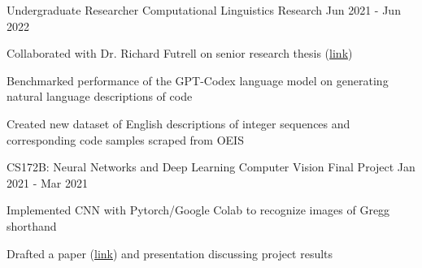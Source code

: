 
\begin{cventries}
    \cventry
	{Undergraduate Researcher}
	{Computational Linguistics Research}
	{}
	{Jun 2021 - Jun 2022}
	{\begin{cvitems}
		\item{Collaborated with Dr. Richard Futrell on senior research thesis (\href{https://www.overleaf.com/read/vchswvmtvtnt}{link})}
		\item{Benchmarked performance of the GPT-Codex language model on generating natural language descriptions of code}
        \item{Created new dataset of English descriptions of integer sequences and corresponding code samples scraped from OEIS} 
	 \end{cvitems}
	}
    
    \cventry
    {CS172B: Neural Networks and Deep Learning}
    {Computer Vision Final Project}
    {}
    {Jan 2021 - Mar 2021}
    {\begin{cvitems}
        \item{Implemented CNN with Pytorch/Google Colab to recognize images of Gregg shorthand}
        \item{Drafted a paper (\href{https://www.overleaf.com/read/rhrgtfcnnsts}{link}) and presentation discussing project results}
     \end{cvitems}
    }
\end{cventries}